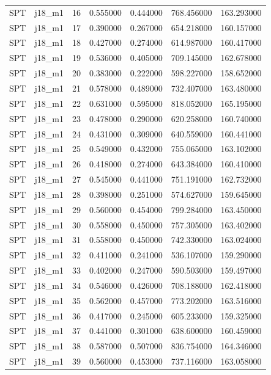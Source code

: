 \begin{tabular}{llrrrrr}
SPT & j18_m1 & 16 & 0.555000 & 0.444000 & 768.456000 & 163.293000 \\
SPT & j18_m1 & 17 & 0.390000 & 0.267000 & 654.218000 & 160.157000 \\
SPT & j18_m1 & 18 & 0.427000 & 0.274000 & 614.987000 & 160.417000 \\
SPT & j18_m1 & 19 & 0.536000 & 0.405000 & 709.145000 & 162.678000 \\
SPT & j18_m1 & 20 & 0.383000 & 0.222000 & 598.227000 & 158.652000 \\
SPT & j18_m1 & 21 & 0.578000 & 0.489000 & 732.407000 & 163.480000 \\
SPT & j18_m1 & 22 & 0.631000 & 0.595000 & 818.052000 & 165.195000 \\
SPT & j18_m1 & 23 & 0.478000 & 0.290000 & 620.258000 & 160.740000 \\
SPT & j18_m1 & 24 & 0.431000 & 0.309000 & 640.559000 & 160.441000 \\
SPT & j18_m1 & 25 & 0.549000 & 0.432000 & 755.065000 & 163.102000 \\
SPT & j18_m1 & 26 & 0.418000 & 0.274000 & 643.384000 & 160.410000 \\
SPT & j18_m1 & 27 & 0.545000 & 0.441000 & 751.191000 & 162.732000 \\
SPT & j18_m1 & 28 & 0.398000 & 0.251000 & 574.627000 & 159.645000 \\
SPT & j18_m1 & 29 & 0.560000 & 0.454000 & 799.284000 & 163.450000 \\
SPT & j18_m1 & 30 & 0.558000 & 0.450000 & 757.305000 & 163.402000 \\
SPT & j18_m1 & 31 & 0.558000 & 0.450000 & 742.330000 & 163.024000 \\
SPT & j18_m1 & 32 & 0.411000 & 0.241000 & 536.107000 & 159.290000 \\
SPT & j18_m1 & 33 & 0.402000 & 0.247000 & 590.503000 & 159.497000 \\
SPT & j18_m1 & 34 & 0.546000 & 0.426000 & 708.188000 & 162.418000 \\
SPT & j18_m1 & 35 & 0.562000 & 0.457000 & 773.202000 & 163.516000 \\
SPT & j18_m1 & 36 & 0.417000 & 0.245000 & 605.233000 & 159.325000 \\
SPT & j18_m1 & 37 & 0.441000 & 0.301000 & 638.600000 & 160.459000 \\
SPT & j18_m1 & 38 & 0.587000 & 0.507000 & 836.754000 & 164.346000 \\
SPT & j18_m1 & 39 & 0.560000 & 0.453000 & 737.116000 & 163.058000 \\

\end{tabular}
